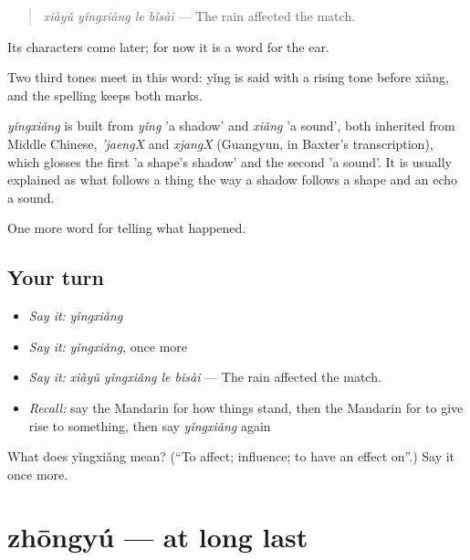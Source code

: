 \begin{quote}
\emph{xiàyǔ yǐngxiǎng le bǐsài} — The rain affected the match.
\end{quote}

Its characters come later; for now it is a word for the ear.

Two third tones meet in this word: yǐng is said with a rising tone before xiǎng, and the spelling keeps both marks.

\begin{cousinweb}
\emph{yǐngxiǎng} is built from \emph{yǐng} 'a shadow' and \emph{xiǎng} 'a sound', both inherited from Middle Chinese, \emph{'jaengX} and \emph{xjangX} (Guangyun, in Baxter's transcription), which glosses the first 'a shape's shadow' and the second 'a sound'. It is usually explained as what follows a thing the way a shadow follows a shape and an echo a sound.
\end{cousinweb}

\begin{grammarlens}[title={What you've built}]
One more word for telling what happened.
\end{grammarlens}

\subsection*{Your turn}
\begin{itemize}
\raggedright
  \item \emph{Say it:} \emph{yǐngxiǎng}
  \item \emph{Say it:} \emph{yǐngxiǎng}, once more
  \item \emph{Say it:} \emph{xiàyǔ yǐngxiǎng le bǐsài} — The rain affected the match.
  \item \emph{Recall:} say the Mandarin for how things stand, then the Mandarin for to give rise to something, then say \emph{yǐngxiǎng} again
\end{itemize}

\begin{tcolorbox}[breakable,colback=teal!4,colframe=teal!35!black,title={Before you move on}]
What does yǐngxiǎng mean? (\textquotedblleft{}To affect; influence; to have an effect on\textquotedblright{}.) Say it once more.
\end{tcolorbox}
\section[zhōngyú]{zhōngyú — at long last}

